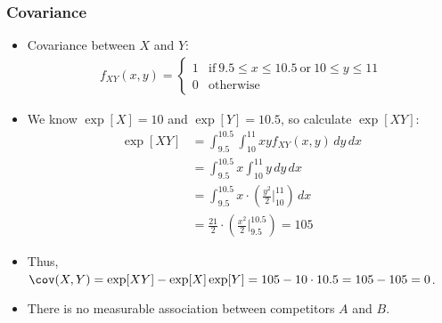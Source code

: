 \begin{frame}
\frametitle{Covariance} 
\begin{itemize}
\item Covariance between $X$ and $Y$:
\begin{align*}
f_{XY}(x,y) = 
  \begin{cases}
  1 & \text{if}~9.5\leq x\leq 10.5 ~\text{or}~ 10 \leq y \leq 11 \\
  0 &\text{otherwise}
\end{cases}
\end{align*}
\item We know $\exp[X] = 10$ and $\exp[Y] = 10.5$, so calculate $\exp[XY]$:
\begin{align*}
\exp[XY] 
    & = \int_{9.5}^{10.5} \int_{10}^{11} xy f_{XY}(x,y) \, dy \, dx \\
    & = \int_{9.5}^{10.5}x \int_{10}^{11} y \,dy \, dx \\
    & = \int_{9.5}^{10.5}x \cdot \left(\frac{y^{2}}{2}\bigg|_{10}^{11}\right) \, dx\\
    & = \frac{21}{2} \cdot \left(\frac{x^{2}}{2}\bigg|_{9.5}^{10.5}\right)
      = 105
\end{align*}
\item Thus, $\cov(X,Y) = \exp[XY] - \exp[X]\exp[Y] = 105-10 \cdot 10.5=105-105=0$. 
\item There is no measurable association between competitors $A$ and $B$.
\end{itemize}
\end{frame}


